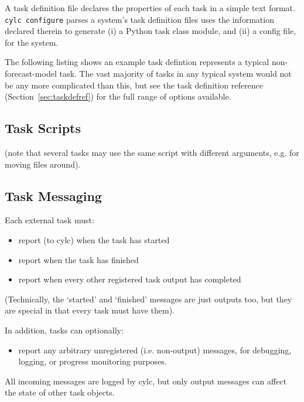 \documentclass[11pt,a4paper]{article}
\begin{document}
A task definition file declares the properties of each task in a simple
text format.  \lstinline=cylc configure= parses a system's task definition
files uses the information declared therein to generate (i) a Python
task class module, and (ii) a config file, for the system.

The following listing shows an example task defintion represents a
typical non-forecast-model task. The vast majority of tasks in any
typical system would not be any more complicated than this, but see the
task definition reference (Section~\ref{sec:taskdefref}) for the full
range of options available.

\lstset{language=cylctaskdef}

{

}

\pagebreak
\subsection{Task Scripts}

(note that several tasks may use the same script with different
arguments, e.g. for moving files around).

\subsection{Task Messaging}

Each external task must:

\begin{itemize}
\item report (to cylc) when the task has started
\item report when the task has finished
\item report when every other registered task output has
completed
\end{itemize}

(Technically, the `started' and `finished' messages are just
outputs too, but they are special in that every task
must have them).

In addition, tasks can optionally:

\begin{itemize}
\item report any arbitrary unregistered (i.e. non-output)
messages, for debugging, logging, or progress monitoring purposes.
\end{itemize}

All incoming messages are logged by cylc, but only output messages can
affect the state of other task objects.
\end{document}
